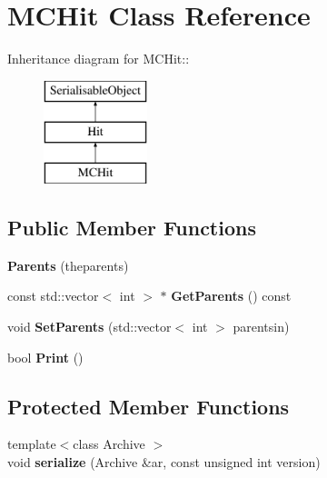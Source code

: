 \hypertarget{classMCHit}{
\section{MCHit Class Reference}
\label{classMCHit}
}
Inheritance diagram for MCHit::\begin{figure}[H]
\begin{center}
\leavevmode
\includegraphics[height=3cm]{classMCHit}
\end{center}
\end{figure}
\subsection*{Public Member Functions}
\begin{DoxyCompactItemize}
\item 
\hypertarget{classMCHit_ab181776ddc1604f20df5799796a76a50}{
{\bfseries Parents} (theparents)}
\label{classMCHit_ab181776ddc1604f20df5799796a76a50}

\item 
\hypertarget{classMCHit_af2a1f4ef53e27bd1c5962a1b61c784d0}{
const std::vector$<$ int $>$ $\ast$ {\bfseries GetParents} () const }
\label{classMCHit_af2a1f4ef53e27bd1c5962a1b61c784d0}

\item 
\hypertarget{classMCHit_a18ae6be9fd39527f915e628ffe65dbec}{
void {\bfseries SetParents} (std::vector$<$ int $>$ parentsin)}
\label{classMCHit_a18ae6be9fd39527f915e628ffe65dbec}

\item 
\hypertarget{classMCHit_a2d016ae3a18d9194a9a45a890f978833}{
bool {\bfseries Print} ()}
\label{classMCHit_a2d016ae3a18d9194a9a45a890f978833}

\end{DoxyCompactItemize}
\subsection*{Protected Member Functions}
\begin{DoxyCompactItemize}
\item 
\hypertarget{classMCHit_ac3213655292d2ae1956ce76bf7bf1fa6}{
{\footnotesize template$<$class Archive $>$ }\\void {\bfseries serialize} (Archive \&ar, const unsigned int version)}
\label{classMCHit_ac3213655292d2ae1956ce76bf7bf1fa6}

\end{DoxyCompactItemize}

